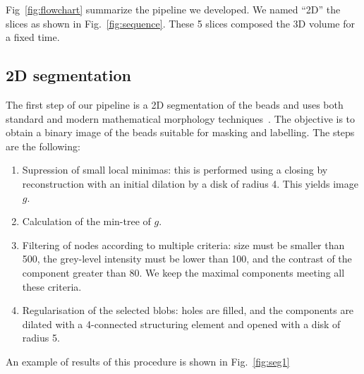\documentclass{llncs}
\begin{document}
Fig~\ref{fig:flowchart} summarize the pipeline we developed. We named ``2D'' the slices as shown in Fig.~\ref{fig:sequence}. These 5 slices composed the 3D volume for a fixed time.

\subsection{2D segmentation}
The first step of our pipeline is a 2D segmentation of the beads and uses both standard and modern mathematical morphology techniques~\cite{najman-talbot-Wiley-2010}. The objective is to obtain a binary image of the beads suitable for masking and labelling. The steps are the following:
\begin{enumerate}
\item Supression of small local minimas: this is performed using a closing by reconstruction with an initial dilation by a disk of radius 4. This yields image $g$.
\item Calculation of the min-tree of $g$.
\item Filtering of nodes according to multiple criteria: size must be smaller than 500, the grey-level intensity must be lower than 100, and the contrast of the component greater than 80. We keep the maximal components meeting all these criteria.
\item Regularisation of the selected blobs: holes are filled, and the components are dilated with a 4-connected structuring element and opened with a disk of radius 5.
\end{enumerate}
An example of results of this procedure is shown in Fig.~\ref{fig:seg1}
\end{document}
